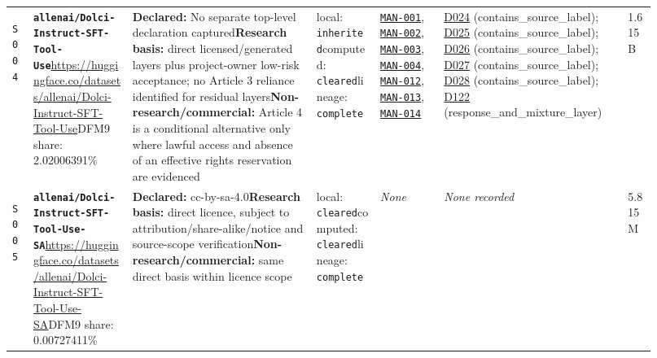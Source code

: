\documentclass[9pt,a4paper]{article}
\newcommand{\srcid}[1]{\hypertarget{src:#1}{\texttt{#1}}}
\begin{document}
\begin{landscape}
\begin{longtable}{@{}L{0.03\linewidth}L{0.14\linewidth}L{0.26\linewidth}L{0.09\linewidth}L{0.09\linewidth}L{0.265\linewidth}L{0.045\linewidth}@{}}
\srcid{S004} & \textbf{\nolinkurl{allenai/Dolci-Instruct-SFT-Tool-Use}}\newline \url{https://huggingface.co/datasets/allenai/Dolci-Instruct-SFT-Tool-Use}\newline DFM9 share: 2.02006391\% & \textbf{Declared:} No separate top-level declaration captured\newline \textbf{Research basis:} direct licensed/generated layers plus project-owner low-risk acceptance; no Article 3 reliance identified for residual layers\newline \textbf{Non-research/commercial:} Article 4 is a conditional alternative only where lawful access and absence of an effective rights reservation are evidenced & local: \texttt{inherited}\newline computed: \texttt{cleared}\newline lineage: \texttt{complete} & \hyperlink{manual:MAN-001}{\texttt{MAN-001}}, \hyperlink{manual:MAN-002}{\texttt{MAN-002}}, \hyperlink{manual:MAN-003}{\texttt{MAN-003}}, \hyperlink{manual:MAN-004}{\texttt{MAN-004}}, \hyperlink{manual:MAN-012}{\texttt{MAN-012}}, \hyperlink{manual:MAN-013}{\texttt{MAN-013}}, \hyperlink{manual:MAN-014}{\texttt{MAN-014}} & \hyperlink{dep:D024}{D024} (contains\_source\_label); \hyperlink{dep:D025}{D025} (contains\_source\_label); \hyperlink{dep:D026}{D026} (contains\_source\_label); \hyperlink{dep:D027}{D027} (contains\_source\_label); \hyperlink{dep:D028}{D028} (contains\_source\_label); \hyperlink{dep:D122}{D122} (response\_and\_mixture\_layer) & 1.615B \\
\srcid{S005} & \textbf{\nolinkurl{allenai/Dolci-Instruct-SFT-Tool-Use-SA}}\newline \url{https://huggingface.co/datasets/allenai/Dolci-Instruct-SFT-Tool-Use-SA}\newline DFM9 share: 0.00727411\% & \textbf{Declared:} cc-by-sa-4.0\newline \textbf{Research basis:} direct licence, subject to attribution/share-alike/notice and source-scope verification\newline \textbf{Non-research/commercial:} same direct basis within licence scope & local: \texttt{cleared}\newline computed: \texttt{cleared}\newline lineage: \texttt{complete} & \textit{None} & \textit{None recorded} & 5.815M \\

\end{longtable}
\end{landscape}
\end{document}
